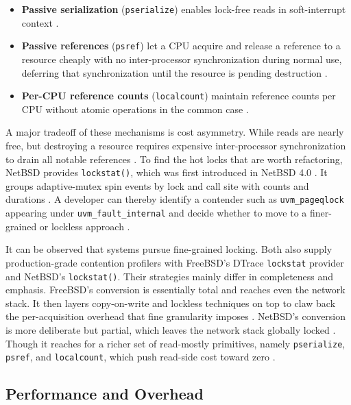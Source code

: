 \begin{itemize}
	\item \textbf{Passive serialization} (\texttt{pserialize}) enables lock-free reads in soft-interrupt context
	      \parencite{netbsd_locking}.
	\item \textbf{Passive references} (\texttt{psref}) let a CPU acquire and release a reference to a resource cheaply with
	      no inter-processor synchronization during normal use, deferring that synchronization until the resource is pending
	      destruction \parencite{netbsd_locking}.
	\item \textbf{Per-CPU reference counts} (\texttt{localcount}) maintain reference counts per CPU without atomic
	      operations in the common case \parencite{netbsd_locking}.
\end{itemize}

\noindent
A major tradeoff of these mechanisms is cost asymmetry. While reads are nearly free, but destroying a resource requires
expensive inter-processor synchronization to drain all notable references \parencite{netbsd_locking}. To find the hot locks
that are worth refactoring, NetBSD provides \texttt{lockstat()}, which was first introduced in NetBSD 4.0
\parencite{netbsd_lockstat}. It groups adaptive-mutex spin events by lock and call site with counts and durations
\parencite{netbsd_lockstat}. A developer can thereby identify a contender such as \texttt{uvm\_pageqlock} appearing under
\texttt{uvm\_fault\_internal} and decide whether to move to a finer-grained or lockless approach \parencite{netbsd_lockstat}.

It can be observed that systems pursue fine-grained locking. Both also supply production-grade contention profilers with
FreeBSD's DTrace \texttt{lockstat} provider and NetBSD's \texttt{lockstat()}. Their strategies mainly differ in completeness
and emphasis. FreeBSD's conversion is essentially total and reaches even the network stack. It then layers copy-on-write and
lockless techniques on top to claw back the per-acquisition overhead that fine granularity imposes \parencite{freebsd_smp_lock_strategies}.
NetBSD's conversion is more deliberate but partial, which leaves the network stack globally locked
\parencite{netbsd_smp_networking}. Though it reaches for a richer set of read-mostly primitives, namely \texttt{pserialize},
\texttt{psref}, and \texttt{localcount}, which push read-side cost toward zero \parencite{netbsd_locking}.

\subsection{Performance and Overhead} \label{concurrency-performance} %

